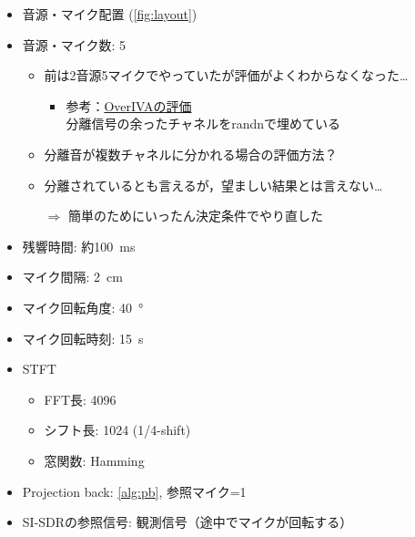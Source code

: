 \documentclass[twocolumn,9pt,dvipdfmx]{article}
\begin{document}
\begin{itemize}
  \item 音源・マイク配置 (\cref{fig:layout})
  \item 音源・マイク数: 5
    \begin{itemize}
      \item 前は2音源5マイクでやっていたが評価がよくわからなくなった…
        \begin{itemize}
          \item 参考：\href{https://github.com/onolab-tmu/overiva/blob/1cb3189112889ebfe2ccbbde0f55b1db6020fc48/overiva_sim.py#L200}{OverIVAの評価}\\
            分離信号の余ったチャネルをrandnで埋めている
        \end{itemize}
      \item 分離音が複数チャネルに分かれる場合の評価方法？
      \item 分離されているとも言えるが，望ましい結果とは言えない…
      \item[$\Rightarrow$] 簡単のためにいったん決定条件でやり直した
    \end{itemize}
  \item 残響時間: 約\SI{100}{\milli\second}
  \item マイク間隔: \SI{2}{\centi\metre}
  \item マイク回転角度: \SI{40}{\degree}
  \item マイク回転時刻: \SI{15}{\second}
  \item STFT
    \begin{itemize}
      \item FFT長: 4096
      \item シフト長: 1024 (1/4-shift)
      \item 窓関数: Hamming
    \end{itemize}
  \item Projection back: \cref{alg:pb}, 参照マイク=1
  \item SI-SDRの参照信号: 観測信号（途中でマイクが回転する）
\end{itemize}

\clearpage\newpage
\end{document}
